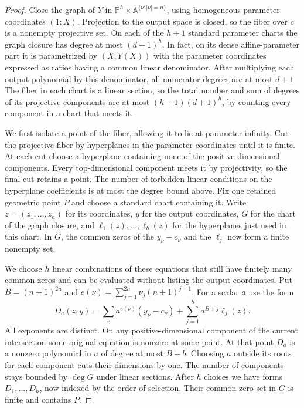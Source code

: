 \documentclass[11pt,letterpaper]{article}
\theoremstyle{definition}
\numberwithin{equation}{section}
\begin{document}
\begin{proof}
Close the graph of $Y$ in $\mathbb{P}^h \times \mathbb{A}^{\{\nu :|\nu|=n\}}$, using homogeneous
parameter coordinates
$(1:X)$. Projection to the output space is closed, so the fiber over $c$ is a nonempty projective
set. On each of the $h+1$ standard parameter charts the graph closure has degree at most
$(d+1)^h$. In fact, on its dense affine-parameter part it is parametrized by $(X,Y(X))$ with
the parameter coordinates expressed as ratios having a common linear denominator. After
multiplying each output polynomial by this denominator, all numerator degrees are at most
$d+1$. The fiber in each chart is a linear section, so the total number and sum of degrees of
its projective components are at most $(h+1)(d+1)^h$, by counting every component in a
chart that meets it.

We first isolate a point of the fiber, allowing it to lie at parameter infinity. Cut the
projective fiber by hyperplanes in the parameter coordinates until it is finite. At each
cut choose a hyperplane containing none of the positive-dimensional components. Every
top-dimensional component meets it by projectivity, so the final cut retains a point. The
number of forbidden linear conditions on the hyperplane coefficients is at most the degree
bound above. Fix one retained geometric point $P$ and choose a standard chart containing it.
Write $z=(z_1,\ldots,z_h)$ for its coordinates, $y$ for the output coordinates, $G$ for the chart of
the graph closure, and $\ell_1(z),\ldots,\ell_b(z)$ for the hyperplanes just used in this chart. In $G$, the
common zeros of the $y_\nu-c_\nu$ and the $\ell_j$ now form a finite nonempty set.

We choose $h$ linear combinations of these equations that still have finitely many common
zeros and can be evaluated without listing the output coordinates. Put $B=(n+1)^{2n}$ and
$e(\nu)=\sum_{j=1}^{2n}\nu_j(n+1)^{j-1}$. For a scalar $a$ use the form
\[
  D_a(z,y) = \sum_\nu a^{e(\nu)}(y_\nu-c_\nu) + \sum_{j=1}^b a^{B+j}\ell_j(z).
\]
All exponents are distinct. On any positive-dimensional component of the current intersection
some original equation is nonzero at some point. At that point $D_a$ is a nonzero polynomial
in $a$ of degree at most $B+b$. Choosing $a$ outside its roots for each component cuts their
dimensions by one. The number of components stays bounded by $\deg G$ under linear sections.
After $h$ choices we have forms $D_1,\ldots,D_h$, now indexed by the order of selection. Their
common zero set in $G$ is finite and contains $P$.


\end{proof}
\end{document}
